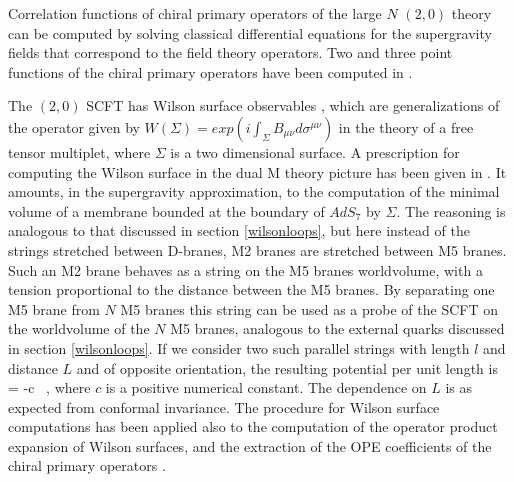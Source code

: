 Correlation functions of chiral primary operators of the large $N$
$(2,0)$ theory can be computed by solving classical differential
equations for the supergravity fields that correspond to the field
theory operators.  Two and three point functions of the chiral primary
operators have been computed in
\cite{Corrado:1999cf}.

The $(2,0)$ SCFT has Wilson surface observables \cite{Ganor:1997nf}, which are
generalizations of the operator given by $W(\Sigma) =
exp (i \int_{\Sigma} B_{\mu\nu} d\sigma^{\mu\nu})$ in the theory of
a free tensor multiplet, where $\Sigma$ is a
two dimensional surface.  A prescription for computing the Wilson
surface in the dual M theory picture has been given in
\cite{Maldacena:1998im}.  It amounts, in the supergravity
approximation, to the computation of the minimal volume of a membrane
bounded at the boundary of $AdS_7$ by $\Sigma$.  The reasoning is
analogous to that discussed in section \ref{wilsonloops}, but here
instead of the strings stretched between D-branes, M2 branes are
stretched between M5 branes.  Such an M2 brane behaves as a string on
the M5 branes worldvolume, with a tension proportional to the distance
between the M5 branes.  By separating one M5 brane from $N$ M5 branes
this string can be used as a probe of the SCFT on the worldvolume of
the $N$ M5 branes, analogous to the external quarks discussed in
section \ref{wilsonloops}.
If we consider two such parallel strings with length $l$ and distance
$L$ and of opposite orientation, the resulting potential per unit length is
\cite{Maldacena:1998im}
\beq
{} = -c \ ,
\eeq
where $c$ is a positive numerical constant.
The dependence on $L$ is as expected from conformal invariance. 
The procedure for Wilson surface computations
has been applied also to the computation of the operator product expansion
of Wilson surfaces, and the extraction of the OPE coefficients of
the chiral primary operators \cite{Corrado:1999cf}.

